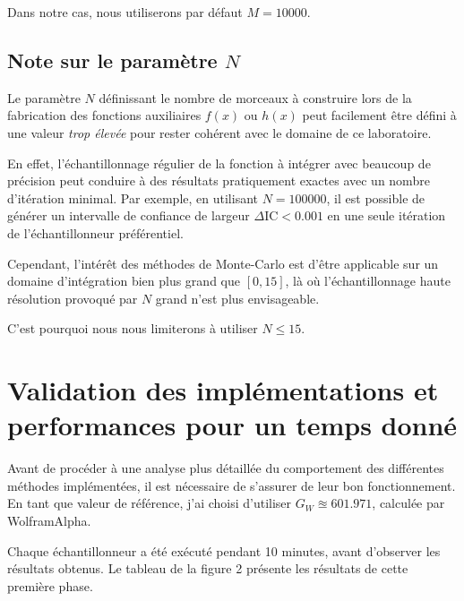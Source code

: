\documentclass[a4paper,11pt]{article}
\begin{document}
Dans notre cas, nous utiliserons par défaut $M=10000$.

\subsection{Note sur le paramètre $N$}

Le paramètre $N$ définissant le nombre de morceaux à construire lors de la fabrication des fonctions auxiliaires $f(x)$ ou $h(x)$ peut facilement être défini à une valeur \emph{trop élevée} pour rester cohérent avec le domaine de ce laboratoire.

En effet, l'échantillonnage régulier de la fonction à intégrer avec beaucoup de précision peut conduire à des résultats pratiquement exactes avec un nombre d'itération minimal. Par exemple, en utilisant $N=100000$, il est possible de générer un intervalle de confiance de largeur $\Delta\text{IC} < 0.001$ en une seule itération de l'échantillonneur préférentiel.

Cependant, l'intérêt des méthodes de Monte-Carlo est d'être applicable sur un domaine d'intégration bien plus grand que $[0,15]$, là où l'échantillonnage haute résolution provoqué par $N$ grand n'est plus envisageable.

C'est pourquoi nous nous limiterons à utiliser $N \le 15$.

\section{Validation des implémentations et performances pour un temps donné}

Avant de procéder à une analyse plus détaillée du comportement des différentes méthodes implémentées, il est nécessaire de s'assurer de leur bon fonctionnement. En tant que valeur de référence, j'ai choisi d'utiliser $G_W \approxeq 601.971$, calculée par WolframAlpha.

Chaque échantillonneur a été exécuté pendant 10 minutes, avant d'observer les résultats obtenus.
Le tableau de la figure 2 présente les résultats de cette première phase.
\end{document}
